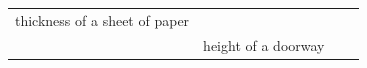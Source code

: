{\begin{tabular}[t]{|l|l|l|l|}
    
        thickness of a sheet of paper &
    
    
         &
    
    
     \tabularnewline\cline{1-1}\cline{2-2}\cline{3-3}\cline{4-4}
    
    
         &
    
    
        height of a doorway &
    
    
         &
    
    
     \tabularnewline\cline{1-1}\cline{2-2}\cline{3-3}\cline{4-4}
    \end{tabular}} %
      \addtocounter{footnote}{-0}
      
    
